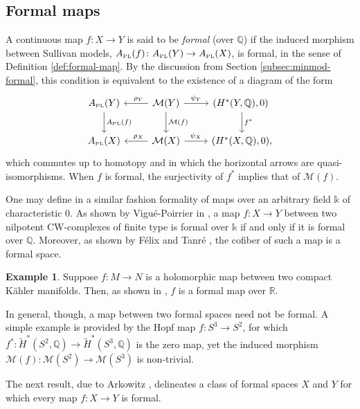 \documentclass{article}
\numberwithin{equation}{section}
\theoremstyle{definition}
\newtheorem{example}[theorem]{Example}
\newcommand{\Q}{\mathbb{Q}}
\newcommand{\R}{\mathbb{R}}
\renewcommand{\k}{\mathbb{k}}
\newcommand{\M}{\mathcal{M}}
\newcommand{\apl}{A_{\scriptscriptstyle{{\rm PL}}}}
\begin{document}
\subsection{Formal maps}
\label{subsec:formal-maps}
A continuous map $f\colon X\to Y$ is said to be {\em formal}\/ 
(over $\Q$) if the induced morphism between Sullivan models,  
$\apl(f)\colon \apl(Y)\to \apl(X)$, is formal, in the sense of 
Definition \ref{def:formal-map}. By the discussion from Section 
\ref{subsec:minmod-formal}, this condition is equivalent to the 
existence of a diagram of the form 
\begin{equation}
\label{eq:formal=map}
\begin{tikzcd}[column sep=24pt, row sep=22pt]
\apl(Y)  \ar{d}{\apl(f)}
&
\M(Y) \ar[swap, pos=.4]{l}{\rho_Y} 
\ar{d}{\M(f)}
\ar{r}{\psi_Y} 
& (H^{*}(Y,\Q), 0)\phantom{,} \ar{d}{f^*}
\\
 \apl(X)
&\M(X)\ar[swap, pos=.4]{l}{\rho_X} \ar{r}{\psi_X}
& (H^{*}(X,\Q), 0) ,
\end{tikzcd}
\end{equation}
which commutes up to homotopy and 
in which the horizontal arrows are quasi-isomor\-phisms. 
When $f$ is formal, the surjectivity of $f^*$ implies that of $\M(f)$. 

One may define in a similar fashion formality of 
maps over an arbitrary field $\k$ of characteristic $0$. 
As shown by Vigu\'{e}-Poirrier in \cite{VP79}, a map 
$f\colon X\to Y$ between two nilpotent CW-complexes 
of finite type is formal over $\k$ if and only if it is 
formal over $\Q$. Moreover, as shown by F\'{e}lix 
and Tanr\'{e} \cite{FT88}, the cofiber of such a map 
is a formal space.

\begin{example}
\label{ex:holo-formal}
Suppose $f\colon M\to N$ is a holomorphic map between two 
compact K\"{a}hler manifolds. Then, as shown in \cite{DGMS}, 
$f$ is a formal map over $\R$.
\end{example}

In general, though, a map between two formal spaces need 
not be formal. A simple example is provided by the Hopf map 
$f\colon S^3\to S^2$, for which $f^*\colon \widetilde{H}^*(S^2,\Q)\to 
\widetilde{H}^*(S^3,\Q)$ is the zero map, yet the induced morphism 
$\M(f)\colon \M(S^2)\to \M(S^3)$ is non-trivial.

The next result, due to Arkowitz \cite{Ark}, delineates a 
class of formal spaces $X$ and $Y$ for which every map 
$f\colon X\to Y$ is formal.
\end{document}

